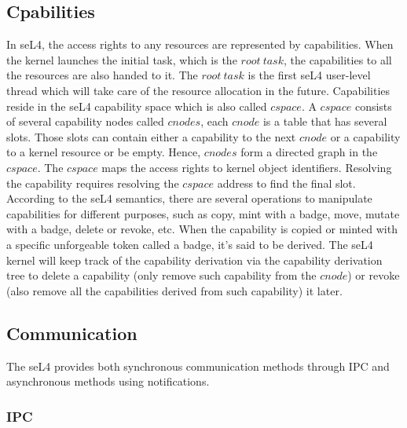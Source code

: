\subsection{Cpabilities}

In seL4, the access rights to any resources are represented by capabilities. When the kernel launches the initial task, which is the $root\ task$, the capabilities to all the resources are also handed to it. The $root\ task$ is the first seL4 user-level thread which will take care of the resource allocation in the future. Capabilities reside in the seL4 capability space which is also called $cspace$. A $cspace$ consists of several capability nodes called $cnodes$, each $cnode$ is a table that has several slots. Those slots can contain either a capability to the next $cnode$ or a capability to a kernel resource or be empty. Hence, $cnodes$ form a directed graph in the $cspace$. The $cspace$ maps the access rights to kernel object identifiers. Resolving the capability requires resolving the $cspace$ address to find the final slot. According to the seL4 semantics, there are several operations to manipulate capabilities for different purposes, such as copy, mint with a badge, move, mutate with a badge, delete or revoke, etc. When the capability is copied or minted with a specific unforgeable token called a badge, it's said to be derived. The seL4 kernel will keep track of the capability derivation via the capability derivation tree to delete a capability (only remove such capability from the $cnode$) or revoke (also remove all the capabilities derived from such capability) it later.

\subsection{Communication}

The seL4 provides both synchronous communication methods through IPC and asynchronous methods using notifications.

\subsubsection{IPC}

